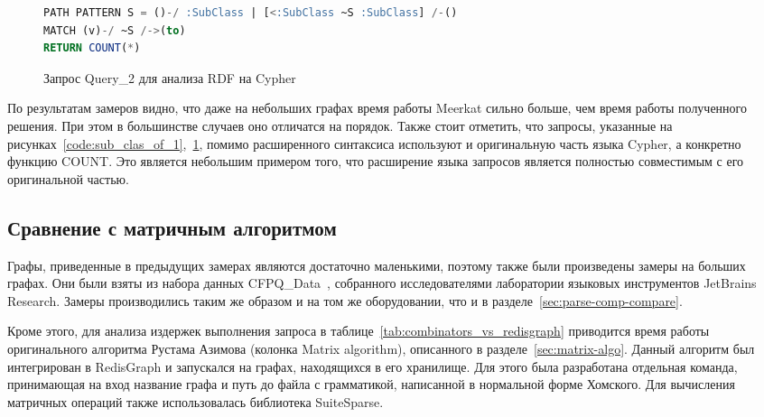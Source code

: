 \begin{figure}[h!]
\begin{adjustbox}{max width=\textwidth}
\begin{lstlisting}[language=sql]
PATH PATTERN S = ()-/ :SubClass | [<:SubClass ~S :SubClass] /-()
MATCH (v)-/ ~S /->(to)
RETURN COUNT(*)
\end{lstlisting}
\end{adjustbox}
\caption{Запрос Query\_2 для анализа RDF на Cypher}
\label{code:sub_clas_of_2}
\end{figure}

По результатам замеров видно, что даже на небольших графах время работы Meerkat сильно больше, чем время работы полученного решения. При этом в большинстве случаев оно отличатся на порядок. Также стоит отметить, что запросы, указанные на рисунках~\ref{code:sub_clas_of_1},~\ref{code:sub_clas_of_2}, помимо расширенного синтаксиса используют и оригинальную часть языка Cyp\-her, а конкретно функцию COUNT. Это является небольшим примером того, что расширение языка запросов является полностью совместимым с его оригинальной частью.


\subsection{Сравнение с матричным алгоритмом}
Графы, приведенные в предыдущих замерах являются достаточно маленькими, поэтому также были произведены замеры на больших графах. Они были взяты из набора данных CFPQ\_Data~\cite{cfpq-data}, собранного исследователями лаборатории языковых инструментов JetBrains Research. Замеры производились таким же образом и на том же оборудовании, что и в разделе~\ref{sec:parse-comp-compare}.


Кроме этого, для анализа издержек выполнения запроса в таблице~\ref{tab:combinators_vs_redisgraph} приводится время работы оригинального алгоритма Рустама Азимова (колонка Matrix algorithm), описанного в разделе~\ref{sec:matrix-algo}. Данный алгоритм был интегрирован в RedisGraph и запускался на графах, находящихся в его хранилище. Для этого была разработана отдельная команда, принимающая на вход название графа и путь до файла с грамматикой, написанной в нормальной форме Хомского. Для вычисления матричных операций также использовалась библиотека SuiteSparse.

